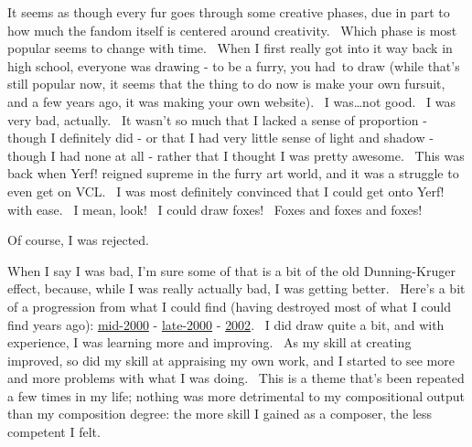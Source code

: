 It seems as though every fur goes through some creative phases, due in
part to how much the fandom itself is centered around creativity. ~Which
phase is most popular seems to change with time. ~When I first really
got into it way back in high school, everyone was drawing - to be a
furry, you had~to draw (while that's still popular now, it seems that
the thing to do now is make your own fursuit, and a few years ago, it
was making your own website). ~I was\ldots{}not good. ~I was very bad,
actually. ~It wasn't so much that I lacked a sense of proportion -
though I definitely did - or that I had very little sense of light and
shadow - though I had none at all - rather that I thought I was pretty
awesome. ~This was back when Yerf! reigned supreme in the furry art
world, and it was a struggle to even get on VCL. ~I was most definitely
convinced that I could get onto Yerf! with ease. ~I mean, look! ~I could
draw foxes! ~Foxes and foxes and foxes!

Of course, I was rejected.

When I say I was bad, I'm sure some of that is a bit of the old
Dunning-Kruger effect, because, while I was really actually bad, I was
getting better. ~Here's a bit of a progression from what I could find
(having destroyed most of what I could find years ago):
\href{http://us-p.vclart.net/vcl/Artists/Matt-Scott/YT_c.JPG}{mid-2000}
-
\href{http://us-p.vclart.net/vcl/Artists/Matt-Scott/Matt011.JPG}{late-2000}
-
\href{http://us-p.vclart.net/vcl/Artists/Matt-J-Scott/dancingfox_c.jpg}{2002}.
~I did draw quite a bit, and with experience, I was learning more and
improving. ~As my skill at creating improved, so did my skill at
appraising my own work, and I started to see more and more problems with
what I was doing. ~This is a theme that's been repeated a few times in
my life; nothing was more detrimental to my compositional output than my
composition degree: the more skill I gained as a composer, the less
competent I felt.

